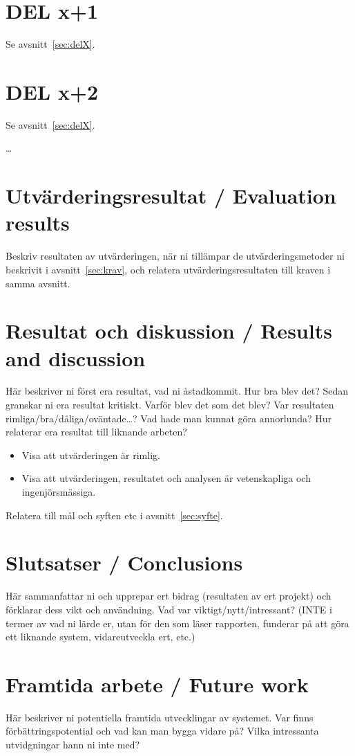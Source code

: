 \documentclass[a4paper,12pt]{article}
\begin{document}
\section{DEL x+1}
Se avsnitt~\ref{sec:delX}.
\section{DEL x+2}
Se avsnitt~\ref{sec:delX}.

\ldots

\section{Utvärderingsresultat / Evaluation results}
Beskriv resultaten av utvärderingen, när ni tillämpar de utvärderingsmetoder ni beskrivit i avsnitt~\ref{sec:krav}, och relatera utvärderingsresultaten till kraven i samma avsnitt.

\section{Resultat och diskussion / Results and discussion}
Här beskriver ni först era resultat, vad ni åstadkommit.  Hur bra blev det?
Sedan granskar ni era resultat kritiskt.  Varför blev det som det blev?  Var resultaten rimliga/bra/dåliga/o\-vän\-ta\-de\ldots?
Vad hade man kunnat göra annorlunda?  Hur relaterar era resultat till liknande arbeten?

\begin{itemize}
\item Visa att utvärderingen är rimlig.
\item Visa att utvärderingen, resultatet och analysen är vetenskapliga och ingenjörsmässiga.
\end{itemize}

Relatera till mål och syften etc i avsnitt~\ref{sec:syfte}.



\section{Slutsatser / Conclusions}
Här sammanfattar ni och upprepar ert bidrag (resultaten av ert projekt) och förklarar dess vikt och användning.  Vad var viktigt/nytt/intressant?  (INTE i termer av vad ni lärde er, utan för den som läser rapporten, funderar på att göra ett liknande system, vidareutveckla ert, etc.)

\section{Framtida arbete / Future work}
Här beskriver ni potentiella framtida utvecklingar av systemet. Var finns förbättrings\-poten\-tial och vad kan man bygga vidare på? Vilka intressanta utvidgningar hann ni inte med?
\end{document}
